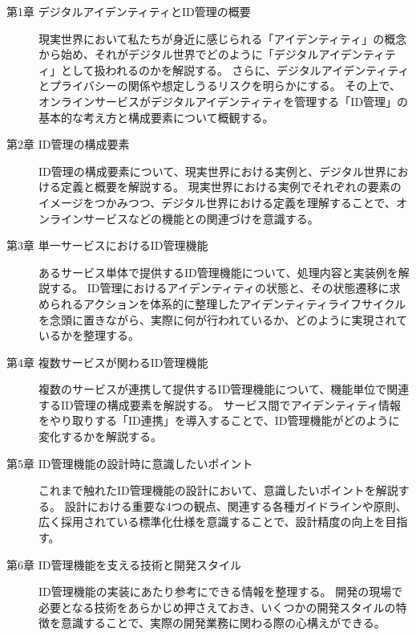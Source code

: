 \documentclass[uplatex]{jsarticle}
\begin{document}
\begin{description}
  \item[第1章 デジタルアイデンティティとID管理の概要]
  現実世界において私たちが身近に感じられる「アイデンティティ」の概念から始め、それがデジタル世界でどのように「デジタルアイデンティティ」として扱われるのかを解説する。
  さらに、デジタルアイデンティティとプライバシーの関係や想定しうるリスクを明らかにする。
  その上で、オンラインサービスがデジタルアイデンティティを管理する「ID管理」の基本的な考え方と構成要素について概観する。

  \item[第2章 ID管理の構成要素]
  ID管理の構成要素について、現実世界における実例と、デジタル世界における定義と概要を解説する。
  現実世界における実例でそれぞれの要素のイメージをつかみつつ、デジタル世界における定義を理解することで、オンラインサービスなどの機能との関連づけを意識する。

  \item[第3章 単一サービスにおけるID管理機能]
  あるサービス単体で提供するID管理機能について、処理内容と実装例を解説する。
  ID管理におけるアイデンティティの状態と、その状態遷移に求められるアクションを体系的に整理したアイデンティティライフサイクルを念頭に置きながら、実際に何が行われているか、どのように実現されているかを整理する。

  \item[第4章 複数サービスが関わるID管理機能]
  複数のサービスが連携して提供するID管理機能について、機能単位で関連するID管理の構成要素を解説する。
  サービス間でアイデンティティ情報をやり取りする「ID連携」を導入することで、ID管理機能がどのように変化するかを解説する。

  \item[第5章 ID管理機能の設計時に意識したいポイント]
  これまで触れたID管理機能の設計において、意識したいポイントを解説する。
  設計における重要な4つの観点、関連する各種ガイドラインや原則、広く採用されている標準化仕様を意識することで、設計精度の向上を目指す。

  \item[第6章 ID管理機能を支える技術と開発スタイル]
  ID管理機能の実装にあたり参考にできる情報を整理する。
  開発の現場で必要となる技術をあらかじめ押さえておき、いくつかの開発スタイルの特徴を意識することで、実際の開発業務に関わる際の心構えができる。
\end{description}

\newpage

\end{document}
